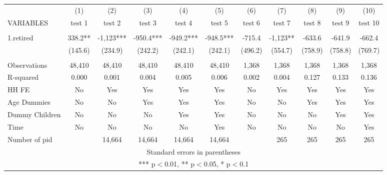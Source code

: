 \begin{tabular}{lcccccccccc} \hline
 & (1) & (2) & (3) & (4) & (5) & (6) & (7) & (8) & (9) & (10) \\
VARIABLES & test 1 & test 2 & test 3 & test 4 & test 5 & test 6 & test 7 & test 8 & test 9 & test 10 \\ \hline
 &  &  &  &  &  &  &  &  &  &  \\
1.retired & 338.2** & -1,123*** & -950.4*** & -949.2*** & -948.5*** & -715.4 & -1,123** & -633.6 & -641.9 & -662.4 \\
 & (145.6) & (234.9) & (242.2) & (242.1) & (242.1) & (496.2) & (554.7) & (758.9) & (758.8) & (769.7) \\
 &  &  &  &  &  &  &  &  &  &  \\
Observations & 48,410 & 48,410 & 48,410 & 48,410 & 48,410 & 1,368 & 1,368 & 1,368 & 1,368 & 1,368 \\
R-squared & 0.000 & 0.001 & 0.004 & 0.005 & 0.006 & 0.002 & 0.004 & 0.127 & 0.133 & 0.136 \\
HH FE & No & Yes & Yes & Yes & Yes & No & Yes & Yes & Yes & Yes \\
Age Dummies & No & No & Yes & Yes & Yes & No & No & Yes & Yes & Yes \\
Dummy Children & No & No & No & Yes & Yes & No & No & No & Yes & Yes \\
Time & No & No & No & No & Yes & No & No & No & No & Yes \\
 Number of pid &  & 14,664 & 14,664 & 14,664 & 14,664 &  & 265 & 265 & 265 & 265 \\ \hline
\multicolumn{11}{c}{ Standard errors in parentheses} \\
\multicolumn{11}{c}{ *** p$<$0.01, ** p$<$0.05, * p$<$0.1} \\
\end{tabular}
